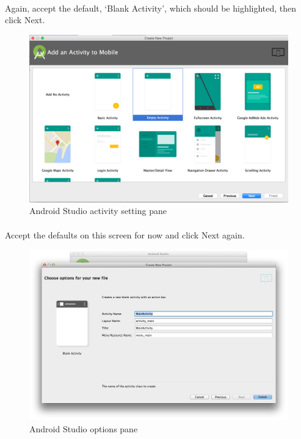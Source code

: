 \paragraph{} Again, accept the default, `Blank Activity', which should be highlighted, then click Next.

\begin{figure}[H]
\centering
\includegraphics[width=\textwidth]{images/android-studio_06_activity}
\caption{Android Studio activity setting pane}
\label{fig:android.studio_activity}
\end{figure}

\paragraph{} Accept the defaults on this screen for now and click Next again.

\begin{figure}[H]
\centering
\includegraphics[width=\textwidth]{images/android-studio_07_options}
\caption{Android Studio options pane}
\label{fig:android.studio_options}
\end{figure}

